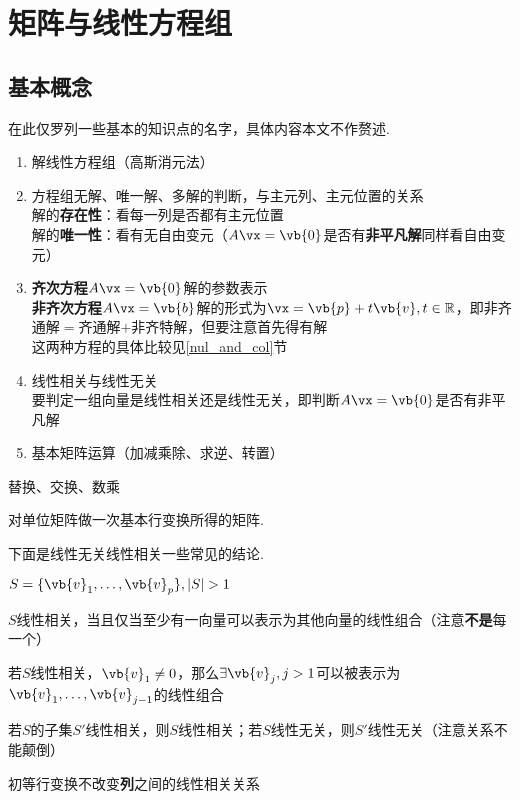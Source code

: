 
\section{矩阵与线性方程组}
\subsection{基本概念}
在此仅罗列一些基本的知识点的名字，具体内容本文不作赘述.
\begin{enumerate}
	\item 解线性方程组（高斯消元法）
	\item 方程组无解、唯一解、多解的判断，与主元列、主元位置的关系\\
		解的\textbf{存在性}：看每一列是否都有主元位置\\
		解的\textbf{唯一性}：看有无自由变元（$A\vx=\vb{0}$是否有\textbf{非平凡解}同样看自由变元）
	\item \textbf{齐次方程}$A\vx=\vb{0}$解的参数表示\\
		\textbf{非齐次方程}$A\vx=\vb{b}$解的形式为$\vx=\vb{p}+t\vb{v},t\in\mathbb{R}$，即非齐通解$=$齐通解$+$非齐特解，但要注意首先得有解\\
		这两种方程的具体比较见\ref{nul_and_col}节
	\item 线性相关与线性无关\\
	要判定一组向量是线性相关还是线性无关，即判断$A\vx=\vb{0}$是否有非平凡解
	\item 基本矩阵运算（加减乘除、求逆、转置）
\end{enumerate}
\begin{definition}
替换、交换、数乘
\end{definition}
\begin{definition}[初等(elementary)矩阵]
对单位矩阵做一次基本行变换所得的矩阵.
\end{definition}
\par 下面是线性无关线性相关一些常见的结论.
\begin{theorem}
\label{linear_relationship}
$S=\{\vb{v}_1,\dots,\vb{v}_p\},|S|>1$
\begin{partlist}
	\item $S$线性相关，当且仅当至少有一向量可以表示为其他向量的线性组合（注意\textbf{不是}每一个）
	\item 若$S$线性相关，$\vb{v}_1\ne 0$，那么$\exists\vb{v}_j,j>1$可以被表示为$\vb{v}_1,\dots,\vb{v}_{j-1}$的线性组合
	\item 若$S$的子集$S'$线性相关，则$S$线性相关；若$S$线性无关，则$S'$线性无关（注意关系不能颠倒）
	\item 初等行变换不改变\textbf{列}之间的线性相关关系
\end{partlist}
\end{theorem}
